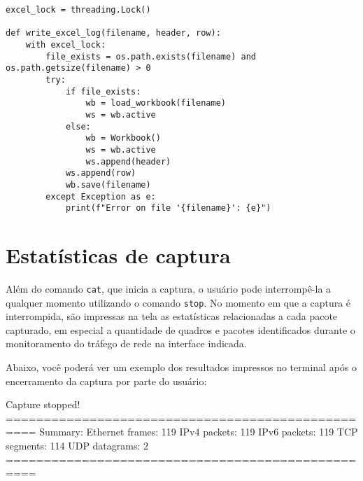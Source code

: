 \documentclass[12pt]{article}
\begin{document}
\begin{lstlisting}[style=vscode]
excel_lock = threading.Lock()

def write_excel_log(filename, header, row):
    with excel_lock:
        file_exists = os.path.exists(filename) and os.path.getsize(filename) > 0
        try:
            if file_exists:
                wb = load_workbook(filename)
                ws = wb.active
            else:
                wb = Workbook()
                ws = wb.active
                ws.append(header)
            ws.append(row)
            wb.save(filename)
        except Exception as e:
            print(f"Error on file '{filename}': {e}")
\end{lstlisting}

\section{Estatísticas de captura}
Além do comando \texttt{cat}, que inicia a captura, o usuário pode interrompê-la a qualquer momento utilizando o comando \texttt{stop}. No momento em que a captura é interrompida, são impressas na tela as estatísticas relacionadas a cada pacote capturado, em especial a quantidade de quadros e pacotes identificados durante o monitoramento do tráfego de rede na interface indicada.

\quad Abaixo, você poderá ver um exemplo dos resultados impressos no terminal após o encerramento da captura por parte do usuário:

\begin{terminal}
Capture stopped!
==================================================
Summary:
Ethernet frames: 119
IPv4 packets:    119
IPv6 packets:    119
TCP segments:    114
UDP datagrams:   2
==================================================
\end{terminal}
\end{document}
